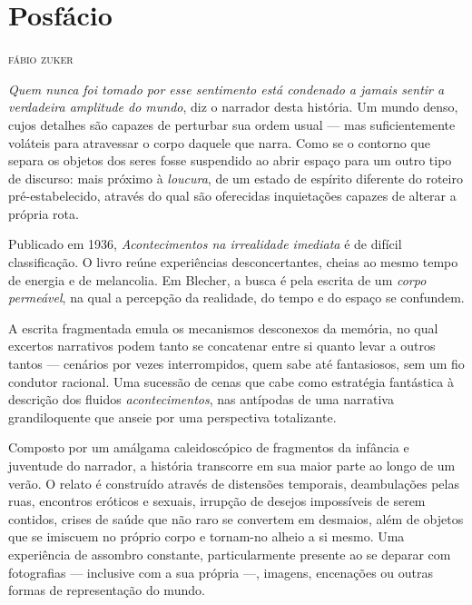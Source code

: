 
\chapter*{Posfácio\smallskip{}}

\begin{flushright}
\textsc{fábio zuker}
\end{flushright}

\noindent{}\textit{Quem nunca foi tomado por esse sentimento está condenado a jamais sentir a verdadeira amplitude do mundo}, diz o narrador desta história. Um mundo  denso, cujos detalhes são capazes de perturbar sua ordem usual --- mas suficientemente voláteis para atravessar o corpo daquele que narra. Como se o contorno que separa os objetos dos seres fosse suspendido ao abrir espaço para um outro tipo de discurso: mais próximo à \textit{loucura}, de um estado de espírito diferente do roteiro pré-estabelecido, através do qual são oferecidas inquietações capazes de alterar a própria rota.

Publicado em 1936, \textit{Acontecimentos na irrealidade imediata} é de difícil classificação. O livro reúne experiências desconcertantes, cheias ao mesmo tempo de energia e de melancolia. Em Blecher, a busca é pela escrita de um \textit{corpo permeável}, na qual a percepção da realidade, do tempo e do espaço se confundem. 

A escrita fragmentada emula os mecanismos desconexos da memória, no qual excertos narrativos podem tanto se concatenar entre si quanto levar a outros tantos --- cenários por vezes interrompidos, quem sabe até fantasiosos, sem um fio condutor racional. Uma sucessão de cenas que cabe como estratégia fantástica à descrição dos fluidos \textit{acontecimentos}, nas antípodas de uma narrativa grandiloquente que anseie por uma perspectiva totalizante.

Composto por um amálgama caleidoscópico de fragmentos da infância e juventude do narrador, a história transcorre em sua maior parte ao longo de um verão. O relato é construído através de distensões temporais, deambulações pelas ruas, encontros eróticos e sexuais, irrupção de desejos impossíveis de serem contidos, crises de saúde que não raro se convertem em desmaios, além de objetos que se imiscuem no próprio corpo e tornam-no alheio a si mesmo. Uma experiência de assombro constante, particularmente presente ao se deparar com fotografias --- inclusive com a sua própria ---, imagens, encenações ou outras formas de representação do mundo.

